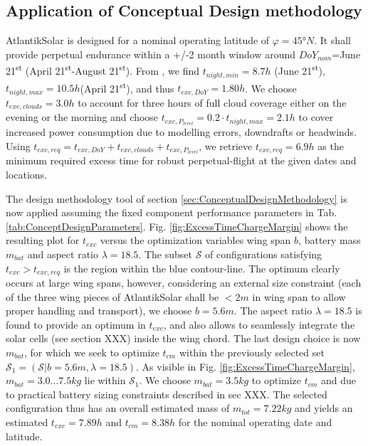  \subsection{Application of Conceptual Design methodology} \label{sec:ConceptDesignApplication}
AtlantikSolar is designed for a nominal operating latitude of $\varphi=45°N$. It shall provide perpetual endurance within a +/-2 month window around $DoY_{nom}$=June 21\textsuperscript{st} (April 21\textsuperscript{st}-August 21\textsuperscript{st}). From \cite{Duffie_SolarEngineering}, we find $t_{night,min}=8.7h$ (June 21\textsuperscript{st}), $t_{night,max}=10.5h$(April 21\textsuperscript{st}), and thus $t_{exc,DoY}=1.80h$. We choose $t_{exc,clouds}=3.0h$ to account for three hours of full cloud coverage either on the evening or the morning and choose $t_{exc,P_{level}}=0.2\cdot t_{night,max}=2.1h$ to cover increased power consumption due to modelling errors, downdrafts or headwinds. Using $t_{exc,req}=t_{exc,DoY}+t_{exc,clouds}+t_{exc,P_{level}}$, we retrieve $t_{exc,req}=6.9h$ as the minimum required excess time for robust perpetual-flight at the given dates and locations. 

The design methodology tool of section \ref{sec:ConceptualDesignMethodology} is now applied assuming the fixed component performance parameters in Tab. \ref{tab:ConceptDesignParameters}. Fig. \ref{fig:ExcessTimeChargeMargin} shows the resulting plot for $t_{exc}$ versus the optimization variables wing span $b$, battery mass $m_{bat}$ and aspect ratio $\lambda=18.5$. The subset $\mathcal{S}$ of configurations satisfying $t_{exc}>t_{exc,req}$ is the region within the blue contour-line. The optimum clearly occurs at large wing spans, however, considering an external size constraint (each of the three wing pieces of AtlantikSolar shall be $<2m$ in wing span to allow proper handling and transport), we choose $b=5.6m$.  The aspect ratio $\lambda=18.5$ is found to provide an optimum in $t_{exc}$, and also allows to seamlessly integrate the solar cells (see section XXX) inside the wing chord. The last design choice is now $m_{bat}$, for which we seek to optimize $t_{cm}$ within the previously selected set $\mathcal{S}_1=(\mathcal{S}|b=5.6m, \lambda=18.5)$. As visible in Fig. \ref{fig:ExcessTimeChargeMargin}, $m_{bat}=3.0...7.5kg$ lie within $\mathcal{S}_1$. We choose $m_{bat}=3.5kg$ to optimize $t_{cm}$ and due to practical battery sizing constraints described in sec XXX. The selected configuration thus has an overall estimated mass of $m_{tot}=7.22kg$ and yields an estimated $t_{exc}=7.89h$ and $t_{cm}=8.38h$ for the nominal operating date and latitude.

